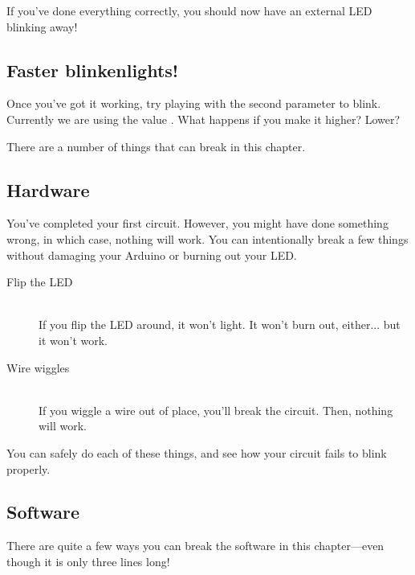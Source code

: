 \newpage



If you've done everything correctly, you should now have an external LED blinking away!

\subsection{Faster blinkenlights!}
Once you've got it working, try playing with the second parameter to {\procname blink}. Currently we are using the value {}. What happens if you make it higher? Lower?

\BREAKAGE
There are a number of things that can break in this chapter.

\subsection{Hardware}
You've completed your first circuit. However, you might have done something wrong, in which case, nothing will work. You can intentionally break a few things without damaging your Arduino or burning out your LED.

\begin{description}
	\item[Flip the LED]\ \\ 
	If you flip the LED around, it won't light. It won't burn out, either... but it won't work.
	\item[Wire wiggles]\ \\
	If you wiggle a wire out of place, you'll break the circuit. Then, nothing will work.
\end{description}

You can safely do each of these things, and see how your circuit fails to blink properly.

\subsection{Software}
There are quite a few ways you can break the software in this chapter---even though it is only three lines long!

